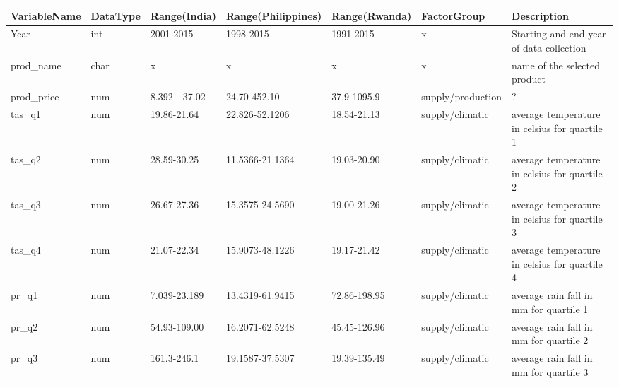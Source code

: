 \documentclass[11pt]{article}
\begin{document}
\begin{table}[!htbp]
\centering
\begin{adjustbox}{max width=\textwidth}

\begin{tabular}{lllllll}
\hline
VariableName           & DataType & Range(India)        & Range(Philippines)  & Range(Rwanda)       & FactorGroup          & Description                                              \\ \hline
Year                   & int      & 2001-2015           & 1998-2015           & 1991-2015           & x                    & Starting and end year of data collection                 \\
prod\_name             & char     & x                   & x                   & x                   & x                    & name of the selected product                             \\
prod\_price            & num      & 8.392 - 37.02       & 24.70-452.10        & 37.9-1095.9         & supply/production    & ?                                                        \\
tas\_q1                & num      & 19.86-21.64         & 22.826-52.1206      & 18.54-21.13         & supply/climatic      & average temperature in celsius for quartile 1            \\
tas\_q2                & num      & 28.59-30.25         & 11.5366-21.1364     & 19.03-20.90         & supply/climatic      & average temperature in celsius for quartile 2            \\
tas\_q3                & num      & 26.67-27.36         & 15.3575-24.5690     & 19.00-21.26         & supply/climatic      & average temperature in celsius for quartile 3            \\
tas\_q4                & num      & 21.07-22.34         & 15.9073-48.1226     & 19.17-21.42         & supply/climatic      & average temperature in celsius for quartile 4            \\
pr\_q1                 & num      & 7.039-23.189        & 13.4319-61.9415     & 72.86-198.95        & supply/climatic      & average rain fall in mm for quartile 1                   \\
pr\_q2                 & num      & 54.93-109.00        & 16.2071-62.5248     & 45.45-126.96        & supply/climatic      & average rain fall in mm for quartile 2                   \\
pr\_q3                 & num      & 161.3-246.1         & 19.1587-37.5307     & 19.39-135.49        & supply/climatic      & average rain fall in mm for quartile 3                   \\

\end{tabular}
\end{adjustbox}
\end{table}
\end{document}
